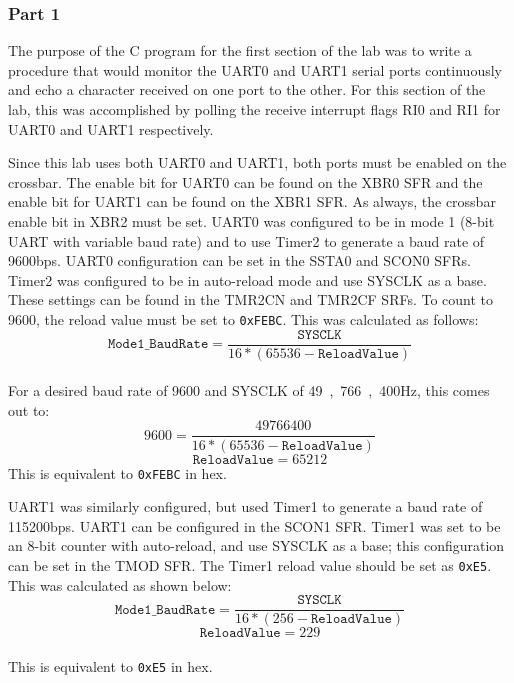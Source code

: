 \documentclass[12pt]{article}
\begin{document}
\subsubsection{Part 1}
The purpose of the C program for the first section of the lab was to write a procedure that would monitor the UART0 and UART1 serial ports continuously and echo a character received on one port to the other. For this section of the lab, this was accomplished by polling the receive interrupt flags RI0 and RI1 for UART0 and UART1 respectively. 

Since this lab uses both UART0 and UART1, both ports must be enabled on the crossbar. The enable bit for UART0 can be found on the XBR0 SFR and the enable bit for UART1 can be found on the XBR1 SFR. As always, the crossbar enable bit in XBR2 must be set. UART0 was configured to be in mode 1 (8-bit UART with variable baud rate) and to use Timer2 to generate a baud rate of \si{9600}{bps}. UART0 configuration can be set in the SSTA0 and SCON0 SFRs. Timer2 was configured to be in auto-reload mode and use SYSCLK as a base. These settings can be found in the TMR2CN and TMR2CF SRFs. To count to 9600, the reload value must be set to \texttt{0xFEBC}. This was calculated as follows:\\
\begin{equation}
	\mathtt{Mode1\_BaudRate} = \frac{\mathtt{SYSCLK}}{16*(65536-\mathtt{ReloadValue})}
\end{equation}\\
For a desired baud rate of 9600 and SYSCLK of \si{49,766,400}{Hz}, this comes out to:\\
\begin{equation}
9600= \frac{49766400}{16*(65536-\mathtt{ReloadValue})}
\end{equation}
\begin{equation}
\mathtt{ReloadValue} = 65212
\end{equation}
This is equivalent to \texttt{0xFEBC} in hex.

UART1 was similarly configured, but used Timer1 to generate a baud rate of \si{115200}{bps}. UART1 can be configured in the SCON1 SFR. Timer1 was set to be an 8-bit counter with auto-reload, and use SYSCLK as a base; this configuration can be set in the TMOD SFR. The Timer1 reload value should be set as \texttt{0xE5}. This was calculated as shown below:\\ 
\begin{equation}
\mathtt{Mode1\_BaudRate} = \frac{\mathtt{SYSCLK}}{16*(256-\mathtt{ReloadValue})}
\end{equation}
\begin{equation}
\mathtt{ReloadValue} = 229
\end{equation}\\
This is equivalent to \texttt{0xE5} in hex.
\end{document}
